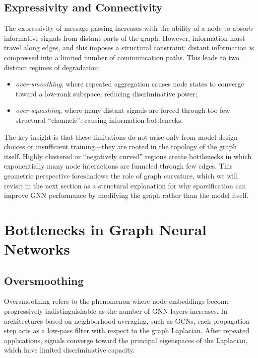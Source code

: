 \documentclass[letterpaper,12pt]{article}
\begin{document}
\subsection{Expressivity and Connectivity}

The expressivity of message passing increases with the ability of a node to absorb informative signals from distant parts of the graph. However, information must travel along edges, and this imposes a structural constraint: distant information is compressed into a limited number of communication paths. This leads to two distinct regimes of degradation:
\begin{itemize}
    \item \textit{over-smoothing}, where repeated aggregation causes node states to converge toward a low-rank subspace, reducing discriminative power;
    \item \textit{over-squashing}, where many distant signals are forced through too few structural ``channels'', causing information bottlenecks.
\end{itemize}

The key insight is that these limitations do not arise only from model design choices or insufficient training---they are rooted in the topology of the graph itself. Highly clustered or ``negatively curved'' regions create bottlenecks in which exponentially many node interactions are funneled through few edges. This geometric perspective foreshadows the role of graph curvature, which we will revisit in the next section as a structural explanation for why sparsification can improve GNN performance by modifying the graph rather than the model itself.

\section{Bottlenecks in Graph Neural Networks}

\subsection{Oversmoothing}

Oversmoothing refers to the phenomenon where node embeddings become progressively indistinguishable as the number of GNN layers increases. In architectures based on neighborhood averaging, such as GCNs, each propagation step acts as a low-pass filter with respect to the graph Laplacian. After repeated applications, signals converge toward the principal eigenspaces of the Laplacian, which have limited discriminative capacity.
\end{document}
